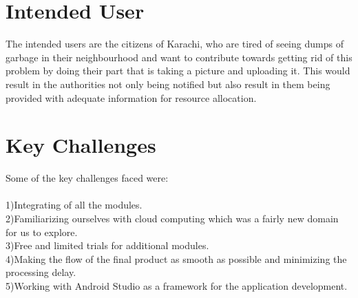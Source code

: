 \section{Intended User}

The intended users are the citizens of Karachi, who are tired of seeing dumps of garbage in their neighbourhood and want to contribute towards getting rid of this problem by doing their part that is taking a picture and uploading it. This would result in the authorities not only being notified but also result in them being provided with adequate information for resource allocation.

\section{Key Challenges}

Some of the key challenges faced were:\\
\\
1)Integrating of all the modules.\\
2)Familiarizing ourselves with cloud computing which was a fairly new domain for us to explore.\\
3)Free and limited trials for additional modules.\\
4)Making the flow of the final product as smooth as possible and minimizing the processing delay.\\
5)Working with Android Studio as a framework for the application development.
